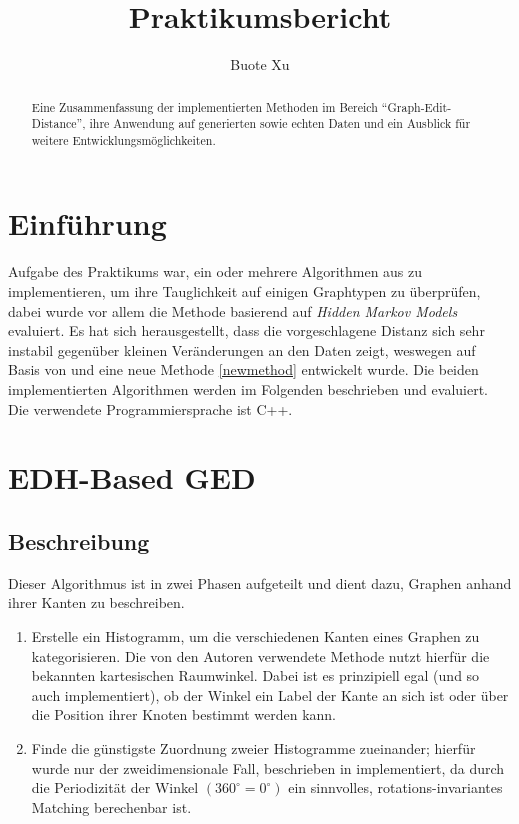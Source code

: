 \documentclass{DEarticle}
\title{Praktikumsbericht}
\author{Buote Xu}
\begin{document}
\maketitle
\begin{abstract}
Eine Zusammenfassung der implementierten Methoden 
im Bereich ``Graph-Edit-Distance'', 
ihre Anwendung auf generierten sowie echten Daten und 
ein Ausblick für weitere Entwicklungsmöglichkeiten.
\end{abstract}

\section{Einführung}
Aufgabe des Praktikums war, ein oder mehrere Algorithmen aus \cite{comp} zu implementieren, um ihre Tauglichkeit auf
einigen Graphtypen zu überprüfen, dabei wurde vor allem die Methode basierend auf \emph{Hidden Markov Models} evaluiert.
Es hat sich herausgestellt, dass die vorgeschlagene Distanz sich sehr instabil gegenüber kleinen
Veränderungen an den Daten zeigt, weswegen auf Basis von \cite{unscented} und \cite{randomwalk} eine neue
Methode \ref{newmethod} entwickelt wurde. Die beiden implementierten Algorithmen werden im Folgenden beschrieben und
evaluiert.
Die verwendete Programmiersprache ist C++.


\section{EDH-Based GED}
\subsection{Beschreibung}
\cite[EDH-Based GED]{comp}
Dieser Algorithmus ist in zwei Phasen aufgeteilt und dient dazu, Graphen anhand ihrer Kanten zu beschreiben.
\begin{enumerate}
\item Erstelle ein Histogramm, um die verschiedenen Kanten eines Graphen zu kategorisieren. Die von den Autoren
verwendete Methode nutzt hierfür die bekannten kartesischen Raumwinkel. Dabei ist es prinzipiell egal (und so auch
implementiert), ob der Winkel ein Label der Kante an sich ist oder über die Position ihrer Knoten bestimmt werden kann.
\item Finde die günstigste Zuordnung zweier Histogramme zueinander; hierfür wurde nur der zweidimensionale Fall,
beschrieben in
\cite[Appendix A]{sift}
implementiert, da durch die Periodizität der Winkel $(360^{\circ} = 0^{\circ})$ ein sinnvolles, rotations-invariantes
Matching berechenbar ist.
\end{enumerate}
\end{document}
